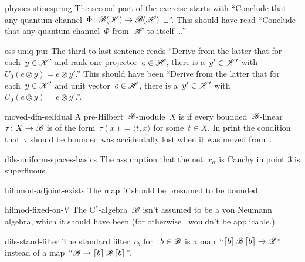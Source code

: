 \begin{erratum}{physics-stinespring}%
The second part of the exercise starts with
    ``Conclude that any quantum channel~$\Phi\colon \mathscr{B}(\mathscr{K}) \to \mathscr{B}(\mathscr{H})$ \ldots''.
This should have read
    ``Conclude that any quantum channel~$\Phi$ from~$\mathscr{H}$ to itself \ldots''
\end{erratum}
\begin{erratum}{ess-uniq-pur}%
The third-to-last sentence reads
``Derive from the latter
that for each~$y \in \mathscr{K}'$ and rank-one projector~$e \in \mathscr{H}$,
there is a~$y' \in \mathscr{K}'$
with~$U_0 (e \otimes y) = e \otimes y'$.''
This should have been
``Derive from the latter
that for each~$y \in \mathscr{K}'$ and unit vector~$e \in \mathscr{H}$,
there is a~$y' \in \mathscr{K}'$
with~$U_0 (e \otimes y) = e \otimes y'$.''.
\end{erratum}
\begin{erratum}{moved-dfn-selfdual}%
    A pre-Hilbert~$\mathscr{B}$-module~$X$ is 
    if every bounded~$\mathscr{B}$-linear~$\tau \colon X \to \mathscr{B}$
    is of the form~$\tau(x) = \langle t, x\rangle$ for some~$t \in X$.
In print the condition that~$\tau$ should be bounded
        was accidentally lost when it was moved from~.
\end{erratum}
\begin{erratum}{dils-uniform-spaces-basics}%
The assumption  that the net~$x_\alpha$ is Cauchy in point 3
    is superfluous.
\end{erratum}
\begin{erratum}{hilbmod-adjoint-exists}%
The map~$T$ should be presumed to be bounded.
\end{erratum}
\begin{erratum}{hilmod-fixed-on-V}%
The C$^*$-algebra~$\mathscr{B}$ isn't assumed to be a von Neumann algebra,
    which it should have been (for otherwise~ wouldn't
    be applicable.)
\end{erratum}
\begin{erratum}{dils-stand-filter}%
The standard filter~$c_b$ for ~$b \in \mathscr{B}$
    is a map~``$\left\lceil b\right\rceil \mathscr{B} \left\lceil b\right\rceil \to \mathscr{B}$''
    instead of a map~``$\mathscr{B} \to \left\lceil b\right\rceil \mathscr{B} \left\lceil b\right\rceil$''.
\end{erratum}

